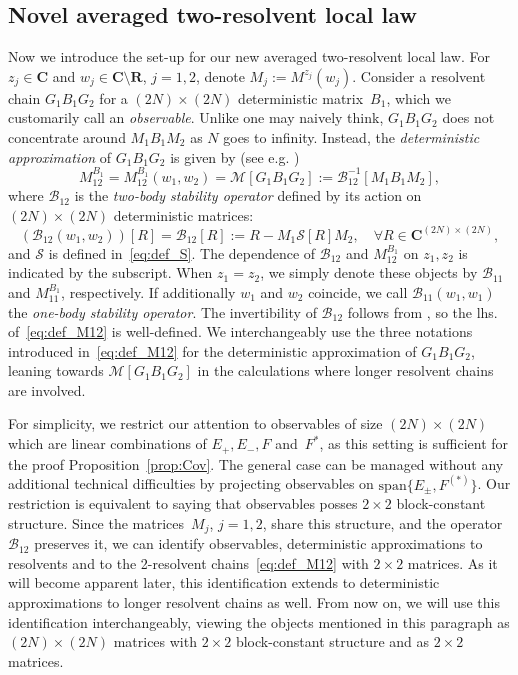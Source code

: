 \documentclass[10pt]{amsart}
\numberwithin{equation}{section}
\newcommand{\R}{\mathbf{R}}
\newcommand{\C}{\mathbf{C}}
\begin{document}
\subsection{Novel averaged two-resolvent local law}\label{sec:2G}

Now we introduce the set-up for our new averaged two-resolvent local law. For $z_j\in \C$ and $w_j\in \C\setminus\R$, $j=1,2$, denote $M_j:=M^{z_j}(w_j)$. Consider a resolvent chain $G_1B_1G_2$ for a $(2N)\times (2N)$ deterministic matrix~$B_1$, which we customarily call an \emph{observable}. Unlike one may naively think, $G_1B_1G_2$ does not concentrate around $M_1B_1M_2$ as $N$ goes to infinity.  Instead, the \emph{deterministic approximation} of $G_1B_1G_2$ is given by (see e.g. \cite[Eq.(5.7),(5.8)]{macroCLT_complex})
\begin{equation}
M_{12}^{B_1}=M_{12}^{B_1}(w_1,w_2)=\mathcal{M}[G_1B_1G_2]:=\mathcal{B}_{12}^{-1}[M_1B_1M_2],
\label{eq:def_M12}
\end{equation}
where $\mathcal{B}_{12}$ is the \emph{two-body stability operator} defined by its action on $(2N)\times (2N)$ deterministic matrices:
\begin{equation}
\left(\mathcal{B}_{12}(w_1,w_2)\right)[R]=\mathcal{B}_{12}[R]:=R-M_1\mathcal{S}[R]M_2,\quad \forall R\in\C^{(2N)\times (2N)},
\label{eq:def_B12}
\end{equation}
and $\mathcal{S}$ is defined in~\eqref{eq:def_S}. The dependence of $\mathcal{B}_{12}$ and $M_{12}^{B_1}$ on $z_1, z_2$ is indicated by the subscript. When $z_1=z_2$, we simply denote these objects by $\mathcal{B}_{11}$ and $M_{11}^{B_1}$, respectively. If additionally $w_1$ and $w_2$ coincide, we call $\mathcal{B}_{11}(w_1,w_1)$ the \emph{one-body stability operator}. The invertibility of $\mathcal{B}_{12}$ follows from \cite[Eq.(6.2)]{macroCLT_complex}, so the lhs. of~\eqref{eq:def_M12} is well-defined. We interchangeably use the three notations introduced in~\eqref{eq:def_M12} for the deterministic approximation of $G_1B_1G_2$, leaning towards $\mathcal{M}[G_1B_1G_2]$ in the calculations where longer resolvent chains are involved. 

For simplicity, we restrict our attention to observables of size $(2N)\times (2N)$ which are linear combinations of $E_+,E_-,F$ and~$F^*$, as this setting is sufficient for the proof Proposition~\ref{prop:Cov}. The general case can be managed without any additional technical difficulties by projecting observables on $\mathrm{span}\{E_\pm,F^{(*)}\}$. Our restriction is equivalent to saying that observables posses $2\times 2$ block-constant structure. Since the matrices~$M_j$, $j=1,2$, share this structure, and the operator~$\mathcal{B}_{12}$ preserves it, we can identify observables, deterministic approximations to resolvents and to the 2-resolvent chains~\eqref{eq:def_M12} with $2\times 2$ matrices. As it will become apparent later, this identification extends to deterministic approximations to longer resolvent chains as well. From now on, we will use this identification interchangeably, viewing the objects mentioned in this paragraph as $(2N)\times (2N)$ matrices with $2\times 2$ block-constant structure and as $2\times 2$ matrices.
\end{document}
